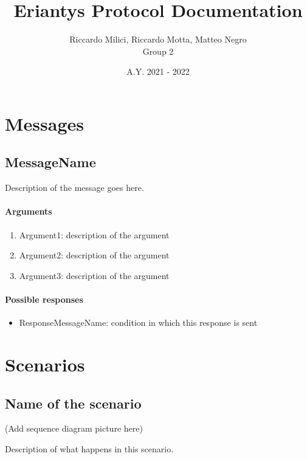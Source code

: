 \documentclass[a4paper]{article}
\title{\textbf{Eriantys Protocol Documentation}}
\author{Riccardo Milici, Riccardo Motta, Matteo Negro\\Group 2}
\date{A.Y. 2021 - 2022}
\begin{document}
	
	\maketitle
	
	
	\section{Messages}
	
	
	\subsection{MessageName}
	Description of the message goes here.
	
	\paragraph{Arguments}
	
	\begin{enumerate}
	\item Argument1: description of the argument
	\item Argument2: description of the argument
	\item Argument3: description of the argument
	\end{enumerate}
	
	\paragraph{Possible responses}
	
	\begin{itemize}
		\item ResponseMessageName: condition in which this response is sent
	\end{itemize}
	
	\section{Scenarios}
	
	\subsection{Name of the scenario}
	
	(Add sequence diagram picture here)
	
	Description of what happens in this scenario.
	
\end{document}
